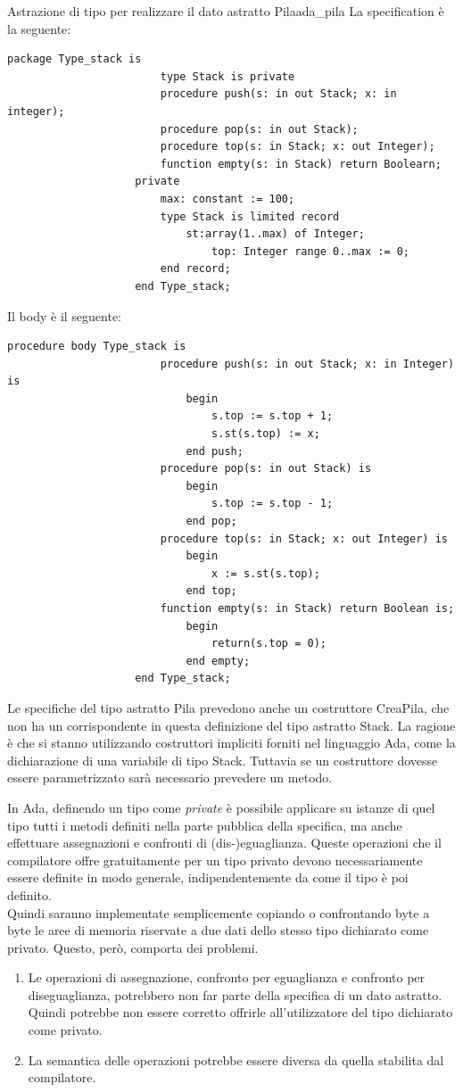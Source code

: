 \documentclass[12pt]{report}
\newcommand{\nmu}{}
\begin{document}
			\begin{example}{\nmu Astrazione di tipo per realizzare il dato astratto Pila}{ada_pila}
				La specification è la seguente:
				\begin{lstlisting}[style=adastyle]
					package Type_stack is
						type Stack is private
						procedure push(s: in out Stack; x: in integer);
						procedure pop(s: in out Stack);
						procedure top(s: in Stack; x: out Integer);
						function empty(s: in Stack) return Boolearn;
					private
						max: constant := 100;
						type Stack is limited record
							st:array(1..max) of Integer;
								top: Integer range 0..max := 0;
						end record;
					end Type_stack;\end{lstlisting}
				Il body è il seguente:
				\begin{lstlisting}[style=adastyle]
					procedure body Type_stack is
						procedure push(s: in out Stack; x: in Integer) is
							begin
								s.top := s.top + 1;
								s.st(s.top) := x;
							end push;
						procedure pop(s: in out Stack) is
							begin
								s.top := s.top - 1;
							end pop;
						procedure top(s: in Stack; x: out Integer) is
							begin
								x := s.st(s.top);
							end top;
						function empty(s: in Stack) return Boolean is;
							begin
								return(s.top = 0);
							end empty;
					end Type_stack;\end{lstlisting}
					Le specifiche del tipo astratto Pila prevedono anche un costruttore CreaPila, che non ha un corrispondente in questa definizione del tipo astratto Stack. La ragione è che si stanno utilizzando costruttori impliciti forniti nel linguaggio Ada, come la dichiarazione di una variabile di tipo Stack. Tuttavia se un costruttore dovesse essere parametrizzato sarà necessario prevedere un metodo.
			\end{example}
			In Ada, definendo un tipo come \textit{private} è possibile applicare su istanze di quel tipo tutti i metodi definiti nella parte pubblica della specifica, ma anche effettuare assegnazioni e confronti di (dis-)eguaglianza. Queste operazioni che il compilatore offre gratuitamente per un tipo privato devono necessariamente essere definite in modo generale, indipendentemente da come il tipo è poi definito. \\
			Quindi saranno implementate semplicemente copiando o confrontando byte a byte le aree di memoria riservate a due dati dello stesso tipo dichiarato come privato. Questo, però, comporta dei problemi.
			\begin{enumerate}
				\item Le operazioni di assegnazione, confronto per eguaglianza e confronto per diseguaglianza, potrebbero non far parte della specifica di un dato astratto. Quindi potrebbe non essere corretto offrirle all'utilizzatore del tipo dichiarato come privato.
				\item La semantica delle operazioni potrebbe essere diversa da quella stabilita dal compilatore.
			\end{enumerate}
\end{document}
